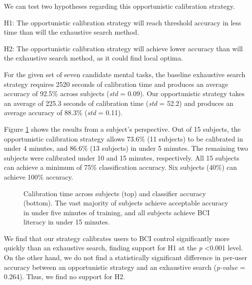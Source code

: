 We can test two hypotheses regarding this opportunistic calibration strategy.

H1: The opportunistic calibration strategy will reach threshold accuracy in less time than will the exhaustive search method.

H2: The opportunistic calibration strategy will achieve lower accuracy than will the exhaustive search method, as it could find local optima.


For the given set of seven candidate mental tasks, the baseline exhaustive search strategy requires 2520 seconds of calibration time and produces an average accuracy of 92.5\% across subjects (\textit{std} = 0.09). Our opportunistic strategy takes an average of 225.3 seconds of calibration time (\textit{std} = 52.2) and produces an average accuracy of 88.3\% (\textit{std} = 0.11).

Figure \ref{fig:calibration_results} shows the results from a subject's perspective. Out of 15 subjects, the opportunistic calibration strategy allows 73.6\% (11 subjects) to be calibrated in under 4 minutes, and 86.6\% (13 subjects) in under 5 minutes. The remaining two subjects were calibrated under 10 and 15 minutes, respectively. All 15 subjects can achieve a minimum of 75\% classification accuracy. Six subjects (40\%) can achieve 100\% accuracy.

\begin{figure}[!h]
  \vspace{-0.2cm}
  \centering
   {}
  \caption{Calibration time across subjects (top) and classifier accuracy (bottom). The vast majority of subjects achieve acceptable accuracy in under five minutes of training, and all subjects achieve BCI literacy in under 15 minutes. }
  \label{fig:calibration_results}
  \vspace{-0.1cm}
\end{figure}

We find that our strategy calibrates users to BCI control significantly more quickly than an exhaustive search, finding support for H1 at the \textit{p} \textless 0.001 level. On the other hand, we do not find a statistically significant difference in per-user accuracy between an opportunistic strategy and an exhaustive search (\textit{p-value} = 0.264). Thus, we find no support for H2.


